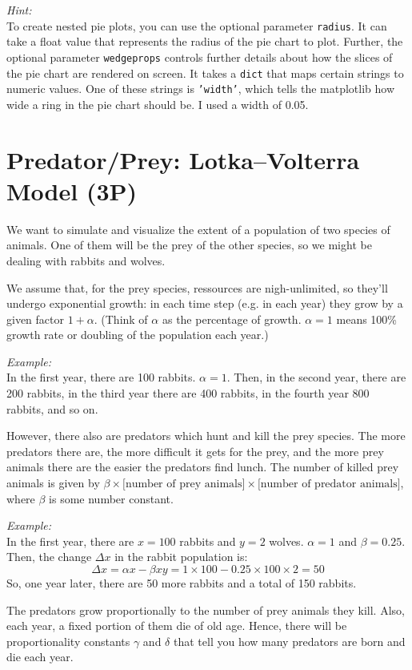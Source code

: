 \documentclass[
	english,
	fontsize=10pt,
	parskip=half,
	titlepage=true,
	DIV=12
]{scrartcl}
\newcommand*{\inPy}[1]{\texttt{#1}}
\newcommand*{\eg}{e.\;g. }
\begin{document}
\emph{Hint:}\\
To create nested pie plots, you can use the optional parameter \texttt{radius}. It can take a float value that represents the radius of the pie chart to plot. Further, the optional parameter \texttt{wedgeprops} controls further details about how the slices of the pie chart are rendered on screen. It takes a \inPy{dict} that maps certain strings to numeric values. One of these strings is \inPy{'width'}, which tells the matplotlib how wide a ring in the pie chart should be. I used a width of 0.05.


\section{Predator/Prey: Lotka–Volterra Model (3\;P)}
We want to simulate and visualize the extent of a population of two species of animals. One of them will be the prey of the other species, so we might be dealing with rabbits and wolves.

We assume that, for the prey species, ressources are nigh-unlimited, so they'll undergo exponential growth: in each time step (\eg in each year) they grow by a given factor $1 + \alpha$. (Think of $\alpha$ as the percentage of growth. $\alpha = 1$ means 100\% growth rate or doubling of the population each year.)

\emph{Example:}\\
In the first year, there are 100 rabbits. $\alpha = 1$. Then, in the second year, there are 200 rabbits, in the third year there are 400 rabbits, in the fourth year 800 rabbits, and so on.

However, there also are predators which hunt and kill the prey species. The more predators there are, the more difficult it gets for the prey, and the more prey animals there are the easier the predators find lunch. The number of killed prey animals is given by $\beta \times \text{[number of prey animals]} \times \text{[number of predator animals]}$, where $\beta$ is some number constant.

\emph{Example:}\\
In the first year, there are $x = 100$ rabbits and $y = 2$ wolves. $\alpha = 1$ and $\beta = 0.25$. Then, the change $\Delta x$ in the rabbit population is:
\[ \Delta x = \alpha x - \beta x y = 1 \times 100 - 0.25 \times 100 \times 2 = 50 \]
So, one year later, there are 50 more rabbits and a total of 150 rabbits.

The predators grow proportionally to the number of prey animals they kill. Also, each year, a fixed portion of them die of old age. Hence, there will be proportionality constants $\gamma$ and $\delta$ that tell you how many predators are born and die each year.
\end{document}
